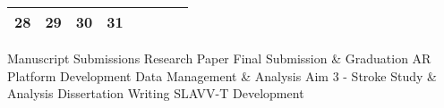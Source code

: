 {\begin{tabularx}{\linewidth}{|l!{\vrule width \myLenLineThicknessThick}*{7}{@{}X@{}|}}
      
      
        \begin{minipage}[t]{6mm}\centering{}28\end{minipage}
      
       & 
    
      
      
        \begin{minipage}[t]{6mm}\centering{}29\end{minipage}
      
       & 
    
      
      
        \begin{minipage}[t]{6mm}\centering{}30\end{minipage}
      
       & 
    
      
      
        \begin{minipage}[t]{6mm}\centering{}31\end{minipage}
      
       & 
    
      
      
       & 
    
      
      
       & 
    
      
      
      
        \\  \hline 
      
    
  
  
  \end{tabularx}
}
\vfill{\centering{} \small{Manuscript Submissions}\hspace{1.5em} \small{Research Paper}\hspace{1.5em} \small{Final Submission \& Graduation}\hspace{1.5em} \small{AR Platform Development}\hspace{1.5em} \small{Data Management \& Analysis}\hspace{1.5em} \small{Aim 3 - Stroke Study \& Analysis}\hspace{1.5em} \small{Dissertation Writing}\hspace{1.5em} \small{SLAVV-T Development}\hspace{1.5em}\par}

